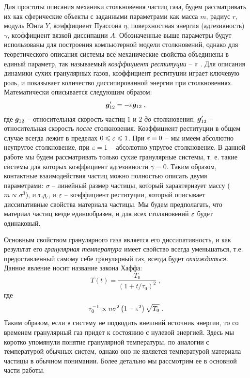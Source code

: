Для простоты описания механики столкновения частиц газа, будем рассматривать их как сферические объекты с заданными параметрами как
масса $m$, радиус $r$, модуль Юнга $Y$, коэффициент Пуассона $\eta$, поверхностная энергия (адгезивность) $\gamma$, коэффициент вязкой диссипации $A$.
Обозначенные выше параметры будут использованы для построения компьютерной модели столкновений, однако для теоретического описания системы
все механические свойства объединены в единый параметр, так называемый \emph{коэффициент реституции} -- $\varepsilon$ \cite{Schwager:2007gm_coll_dyn}. 
Для описания динамики сухих
гранулярных газов, коэффициент реституции играет ключевую роль, и показывает количество диссипированной энергии при столкновениях. Математически
описывается следующим образом:
\begin{equation}\label{eq:restitution}
    \bm{g}'_{12} = -\varepsilon\bm{g}_{12}\;,
\end{equation}
где $\bm{g}_{12}$ -- относительная скорость частиц $1$ и $2$ \emph{до} столкновения, $\bm{g}'_{12}$ -- относительная скорость \emph{после} столкновения.
Коэффициент реституции в общем случае всегда лежит в пределах $0\leqslant\varepsilon\leqslant 1$. При $\varepsilon = 0$ -- мы имеем абсолютно неупругое столкновение, 
при $\varepsilon = 1$ -- абсолютно упругое столкновение. В данной работе мы будем рассматривать только сухие гранулярные системы, т. е. такие
системы для которых коэффициент адгезивности $\gamma = 0$. Таким образом, контактные взаимодействия частиц можно полностью описать двумя параметрами:
$\sigma$ -- линейный размер частицы, который характеризует массу ($m\propto \sigma^3$), и т.д., 
и $\varepsilon$ -- коэффициент реституции, который описывает диссипативные свойства материала частицы. Мы будем предполагать, что материал частиц 
везде единообразен, и для всех столкновений $\varepsilon$ будет одинаковый. 

Основным свойством гранулярного газа является его диссипативность, и как результат его \emph{гранулярная температура} имеет свойство всегда уменьшаться, 
т.е. предоставленный самому себе гранулярный газ, всегда будет \emph{охлаждаться}. Данное явление носит название закона Хаффа:
\begin{equation}
    T(t) = \frac{T_0}{(1+t/\tau_0)^2}\;, 
\end{equation}
где
\begin{equation}
    \tau^{-1}_0\propto n\sigma^2\left(1-\varepsilon^2\right)\sqrt{T_0}\;.
\end{equation}
Таким образом, если в систему не подводить внешний источник энергии, то со временем гранулярный газ придет к состоянию с нулевой энергией. Здесь мы
коротко упомянули понятие гранулярной температуры, по аналогии с температурой обычных систем, однако оно не является температурой материала частицы 
в обычном понимании. Более детально мы рассмотрим ее в основной части работы.

